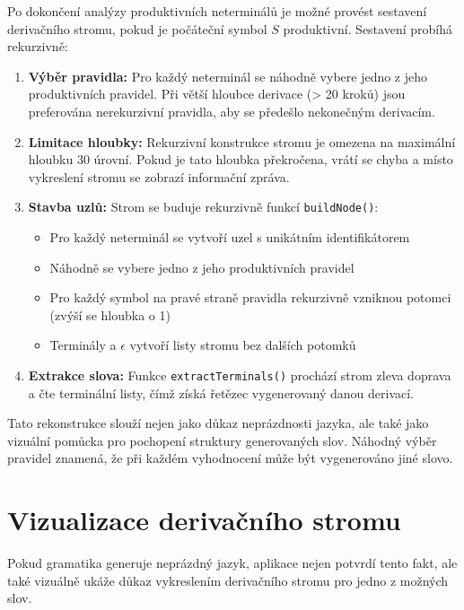 Po dokončení analýzy produktivních neterminálů je možné provést sestavení derivačního stromu, pokud je počáteční symbol \( S \) produktivní. Sestavení probíhá rekurzivně:

\begin{enumerate}
    \item \textbf{Výběr pravidla:} Pro každý neterminál se náhodně vybere jedno z jeho produktivních pravidel. Při větší hloubce derivace (> 20 kroků) jsou preferována nerekurzivní pravidla, aby se předešlo nekonečným derivacím.
    
    \item \textbf{Limitace hloubky:} Rekurzivní konstrukce stromu je omezena na maximální hloubku 30 úrovní. Pokud je tato hloubka překročena, vrátí se chyba a místo vykreslení stromu se zobrazí informační zpráva.
    
    \item \textbf{Stavba uzlů:} Strom se buduje rekurzivně funkcí \texttt{buildNode()}:
    \begin{itemize}
        \item Pro každý neterminál se vytvoří uzel s unikátním identifikátorem
        \item Náhodně se vybere jedno z jeho produktivních pravidel
        \item Pro každý symbol na pravé straně pravidla rekurzivně vzniknou potomci (zvýší se hloubka o 1)
        \item Terminály a \( \epsilon \) vytvoří listy stromu bez dalších potomků
    \end{itemize}
    
    \item \textbf{Extrakce slova:} Funkce \texttt{extractTerminals()} prochází strom zleva doprava a čte terminální listy, čímž získá řetězec vygenerovaný danou derivací.
\end{enumerate}

Tato rekonstrukce slouží nejen jako důkaz neprázdnosti jazyka, ale také jako vizuální pomůcka pro pochopení struktury generovaných slov. Náhodný výběr pravidel znamená, že při každém vyhodnocení může být vygenerováno jiné slovo.

\section{Vizualizace derivačního stromu}
\label{sec:GrammarsVisualization}

Pokud gramatika generuje neprázdný jazyk, aplikace nejen potvrdí tento fakt, ale také vizuálně ukáže důkaz vykreslením derivačního stromu pro jedno z možných slov.

